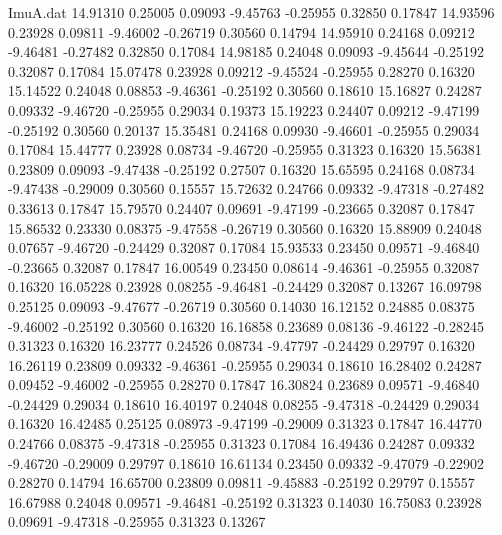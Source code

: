 \begin{filecontents}{ImuA.dat}
  14.91310    0.25005    0.09093   -9.45763   -0.25955    0.32850    0.17847
  14.93596    0.23928    0.09811   -9.46002   -0.26719    0.30560    0.14794
  14.95910    0.24168    0.09212   -9.46481   -0.27482    0.32850    0.17084
  14.98185    0.24048    0.09093   -9.45644   -0.25192    0.32087    0.17084
  15.07478    0.23928    0.09212   -9.45524   -0.25955    0.28270    0.16320
  15.14522    0.24048    0.08853   -9.46361   -0.25192    0.30560    0.18610
  15.16827    0.24287    0.09332   -9.46720   -0.25955    0.29034    0.19373
  15.19223    0.24407    0.09212   -9.47199   -0.25192    0.30560    0.20137
  15.35481    0.24168    0.09930   -9.46601   -0.25955    0.29034    0.17084
  15.44777    0.23928    0.08734   -9.46720   -0.25955    0.31323    0.16320
  15.56381    0.23809    0.09093   -9.47438   -0.25192    0.27507    0.16320
  15.65595    0.24168    0.08734   -9.47438   -0.29009    0.30560    0.15557
  15.72632    0.24766    0.09332   -9.47318   -0.27482    0.33613    0.17847
  15.79570    0.24407    0.09691   -9.47199   -0.23665    0.32087    0.17847
  15.86532    0.23330    0.08375   -9.47558   -0.26719    0.30560    0.16320
  15.88909    0.24048    0.07657   -9.46720   -0.24429    0.32087    0.17084
  15.93533    0.23450    0.09571   -9.46840   -0.23665    0.32087    0.17847
  16.00549    0.23450    0.08614   -9.46361   -0.25955    0.32087    0.16320
  16.05228    0.23928    0.08255   -9.46481   -0.24429    0.32087    0.13267
  16.09798    0.25125    0.09093   -9.47677   -0.26719    0.30560    0.14030
  16.12152    0.24885    0.08375   -9.46002   -0.25192    0.30560    0.16320
  16.16858    0.23689    0.08136   -9.46122   -0.28245    0.31323    0.16320
  16.23777    0.24526    0.08734   -9.47797   -0.24429    0.29797    0.16320
  16.26119    0.23809    0.09332   -9.46361   -0.25955    0.29034    0.18610
  16.28402    0.24287    0.09452   -9.46002   -0.25955    0.28270    0.17847
  16.30824    0.23689    0.09571   -9.46840   -0.24429    0.29034    0.18610
  16.40197    0.24048    0.08255   -9.47318   -0.24429    0.29034    0.16320
  16.42485    0.25125    0.08973   -9.47199   -0.29009    0.31323    0.17847
  16.44770    0.24766    0.08375   -9.47318   -0.25955    0.31323    0.17084
  16.49436    0.24287    0.09332   -9.46720   -0.29009    0.29797    0.18610
  16.61134    0.23450    0.09332   -9.47079   -0.22902    0.28270    0.14794
  16.65700    0.23809    0.09811   -9.45883   -0.25192    0.29797    0.15557
  16.67988    0.24048    0.09571   -9.46481   -0.25192    0.31323    0.14030
  16.75083    0.23928    0.09691   -9.47318   -0.25955    0.31323    0.13267

\end{filecontents}
